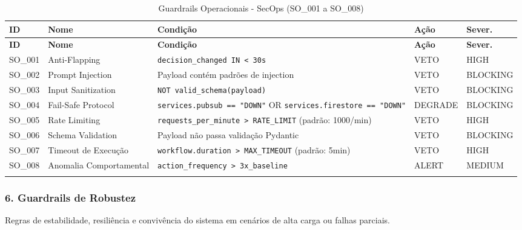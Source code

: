\documentclass[12pt, a4paper]{article}
\begin{document}
{\small
\begin{longtable}{|p{1.5cm}|p{2.8cm}|p{6cm}|p{2cm}|p{2cm}|}
\hline
\textbf{ID} & \textbf{Nome} & \textbf{Condição} & \textbf{Ação} & \textbf{Sever.} \\ \hline
\endfirsthead
\hline
\textbf{ID} & \textbf{Nome} & \textbf{Condição} & \textbf{Ação} & \textbf{Sever.} \\ \hline
\endhead

SO\_001 & Anti-Flapping & \texttt{decision\_changed IN < 30s} & VETO & HIGH \\ \hline

SO\_002 & Prompt Injection & Payload contém padrões de injection & VETO & BLOCKING \\ \hline

SO\_003 & Input Sanitization & \texttt{NOT valid\_schema(payload)} & VETO & BLOCKING \\ \hline

SO\_004 & Fail-Safe Protocol & \texttt{services.pubsub == "DOWN"} OR \texttt{services.firestore == "DOWN"} & DEGRADE & BLOCKING \\ \hline

SO\_005 & Rate Limiting & \texttt{requests\_per\_minute > RATE\_LIMIT} (padrão: 1000/min) & VETO & HIGH \\ \hline

SO\_006 & Schema Validation & Payload não passa validação Pydantic & VETO & BLOCKING \\ \hline

SO\_007 & Timeout de Execução & \texttt{workflow.duration > MAX\_TIMEOUT} (padrão: 5min) & VETO & HIGH \\ \hline

SO\_008 & Anomalia Comportamental & \texttt{action\_frequency > 3x\_baseline} & ALERT & MEDIUM \\ \hline

\caption{Guardrails Operacionais - SecOps (SO\_001 a SO\_008)}
\end{longtable}
}

\subsubsection{6. Guardrails de Robustez}

Regras de estabilidade, resiliência e convivência do sistema em cenários de alta carga ou falhas parciais.
\end{document}
